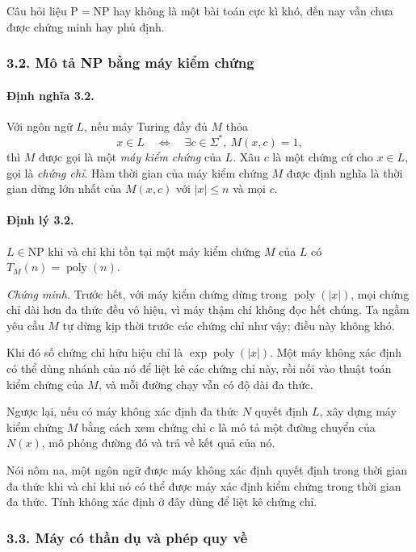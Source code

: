 \documentclass[11pt]{article}
\begin{document}
Câu hỏi liệu \(\mathrm P=\mathrm{NP}\) hay không là một bài toán cực kì khó,
đến nay vẫn chưa được chứng minh hay phủ định.

\subsubsection*{3.2. Mô tả NP bằng máy kiểm chứng}

\paragraph{Định nghĩa 3.2.}
Với ngôn ngữ \(L\), nếu máy Turing đầy đủ \(M\) thỏa
\[
  x\in L\quad\Longleftrightarrow\quad \exists c\in\Sigma^*,\ M(x,c)=1,
\]
thì \(M\) được gọi là một \emph{máy kiểm chứng} của \(L\). Xâu \(c\) là một
chứng cứ cho \(x\in L\), gọi là \emph{chứng chỉ}. Hàm thời gian của máy kiểm
chứng \(M\) được định nghĩa là thời gian dừng lớn nhất của \(M(x,c)\) với
\(|x|\le n\) và mọi \(c\).

\paragraph{Định lý 3.2.}
\(L\in\mathrm{NP}\) khi và chỉ khi tồn tại một máy kiểm chứng \(M\) của \(L\)
có \(T_M(n)=\operatorname{poly}(n)\).

\emph{Chứng minh.}
Trước hết, với máy kiểm chứng dừng trong \(\operatorname{poly}(|x|)\), mọi
chứng chỉ dài hơn đa thức đều vô hiệu, vì máy thậm chí không đọc hết chúng. Ta
ngầm yêu cầu \(M\) tự dừng kịp thời trước các chứng chỉ như vậy; điều này không
khó.

Khi đó số chứng chỉ hữu hiệu chỉ là \(\exp\operatorname{poly}(|x|)\). Một máy
không xác định có thể dùng nhánh của nó để liệt kê các chứng chỉ này, rồi nối
vào thuật toán kiểm chứng của \(M\), và mỗi đường chạy vẫn có độ dài đa thức.

Ngược lại, nếu có máy không xác định đa thức \(N\) quyết định \(L\), xây dựng
máy kiểm chứng \(M\) bằng cách xem chứng chỉ \(c\) là mô tả một đường chuyển của
\(N(x)\), mô phỏng đường đó và trả về kết quả của nó.

Nói nôm na, một ngôn ngữ được máy không xác định quyết định trong thời gian đa
thức khi và chỉ khi nó có thể được máy xác định kiểm chứng trong thời gian đa
thức. Tính không xác định ở đây dùng để liệt kê chứng chỉ.

\subsubsection*{3.3. Máy có thần dụ và phép quy về}
\end{document}
